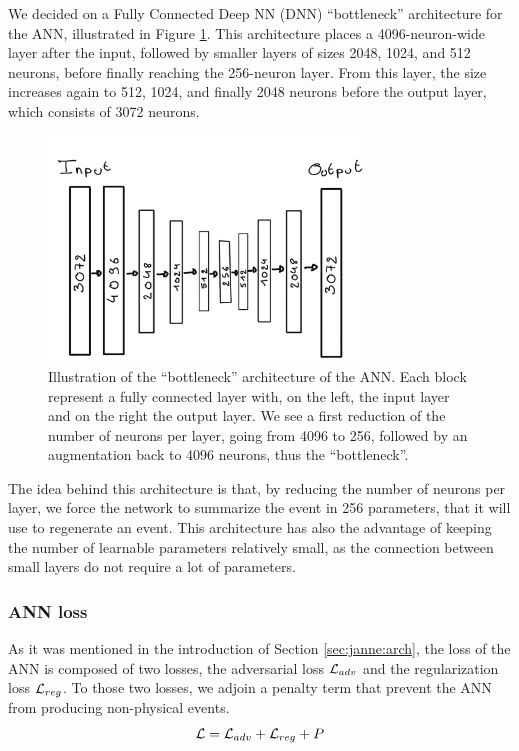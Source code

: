 \documentclass[../main.tex]{subfiles}
\begin{document}
We decided on a Fully Connected Deep NN (DNN) ``bottleneck'' architecture for the ANN, illustrated in Figure \ref{fig:janne:ann_arch}. This architecture places a 4096-neuron-wide layer after the input, followed by smaller layers of sizes 2048, 1024, and 512 neurons, before finally reaching the 256-neuron layer. From this layer, the size increases again to 512, 1024, and finally 2048 neurons before the output layer, which consists of 3072 neurons.


\begin{figure}
  \centering
  \includegraphics[height=6cm]{images/janne/ANN_illustration.png}
  \caption{Illustration of the ``bottleneck'' architecture of the ANN. Each block represent a fully connected layer with, on the left, the input layer and on the right the output layer. We see a first reduction of the number of neurons per layer, going from 4096 to 256, followed by an augmentation back to 4096 neurons, thus the ``bottleneck''.}
  \label{fig:janne:ann_arch}
\end{figure}

The idea behind this architecture is that, by reducing the number of neurons per layer, we force the network to summarize the event in 256 parameters, that it will use to regenerate an event. This architecture has also the advantage of keeping the number of learnable parameters relatively small, as the connection between small layers do not require a lot of parameters.

\subsubsection{ANN loss}

As it was mentioned in the introduction of Section \ref{sec:janne:arch}, the loss of the ANN is composed of two losses, the adversarial loss ${\cal L}_{adv}$ and the regularization loss ${\cal L}_{reg}$. To those two losses, we adjoin a penalty term that prevent the ANN from producing non-physical events.
\begin{equation*}
  {\cal L} = {\cal L}_{adv} + {\cal L}_{reg} + P
\end{equation*}
\end{document}
